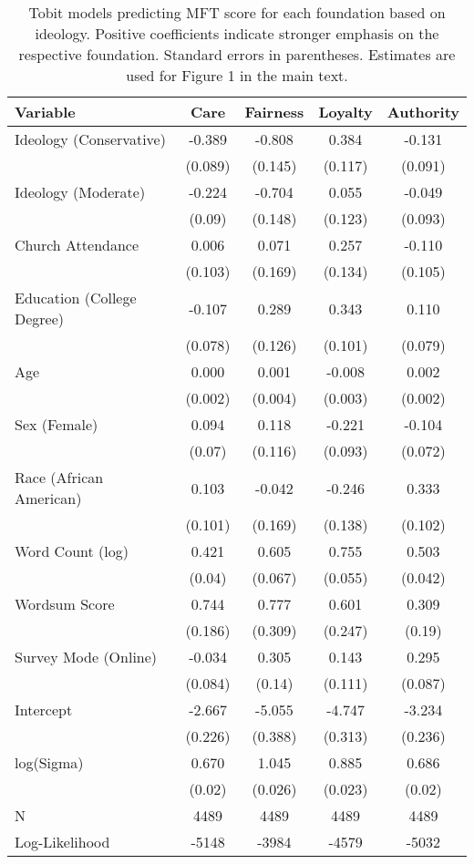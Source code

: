 \begin{table}[ht]
\centering
\caption{Tobit models predicting MFT score for each foundation based 
           on ideology. Positive coefficients indicate stronger emphasis on the respective 
           foundation. Standard errors in parentheses. Estimates are used for Figure 
           1 in the main text.} 
\label{tab:tobit_ideol}
\begingroup\footnotesize
\begin{tabular}{lcccc}
  \hline
Variable & Care & Fairness & Loyalty & Authority \\ 
  \hline
Ideology (Conservative) & -0.389 & -0.808 &  0.384 & -0.131 \\ 
   & (0.089) & (0.145) & (0.117) & (0.091) \\ 
  Ideology (Moderate) & -0.224 & -0.704 &  0.055 & -0.049 \\ 
   & (0.09) & (0.148) & (0.123) & (0.093) \\ 
  Church Attendance &  0.006 &  0.071 &  0.257 & -0.110 \\ 
   & (0.103) & (0.169) & (0.134) & (0.105) \\ 
  Education (College Degree) & -0.107 &  0.289 &  0.343 &  0.110 \\ 
   & (0.078) & (0.126) & (0.101) & (0.079) \\ 
  Age &  0.000 &  0.001 & -0.008 &  0.002 \\ 
   & (0.002) & (0.004) & (0.003) & (0.002) \\ 
  Sex (Female) &  0.094 &  0.118 & -0.221 & -0.104 \\ 
   & (0.07) & (0.116) & (0.093) & (0.072) \\ 
  Race (African American) &  0.103 & -0.042 & -0.246 &  0.333 \\ 
   & (0.101) & (0.169) & (0.138) & (0.102) \\ 
  Word Count (log) &  0.421 &  0.605 &  0.755 &  0.503 \\ 
   & (0.04) & (0.067) & (0.055) & (0.042) \\ 
  Wordsum Score &  0.744 &  0.777 &  0.601 &  0.309 \\ 
   & (0.186) & (0.309) & (0.247) & (0.19) \\ 
  Survey Mode (Online) & -0.034 &  0.305 &  0.143 &  0.295 \\ 
   & (0.084) & (0.14) & (0.111) & (0.087) \\ 
  Intercept & -2.667 & -5.055 & -4.747 & -3.234 \\ 
   & (0.226) & (0.388) & (0.313) & (0.236) \\ 
  log(Sigma) &  0.670 &  1.045 &  0.885 &  0.686 \\ 
   & (0.02) & (0.026) & (0.023) & (0.02) \\ 
   \hline
N & 4489 & 4489 & 4489 & 4489 \\ 
  Log-Likelihood & -5148 & -3984 & -4579 & -5032 \\ 
   \hline
\end{tabular}
\endgroup
\end{table}
